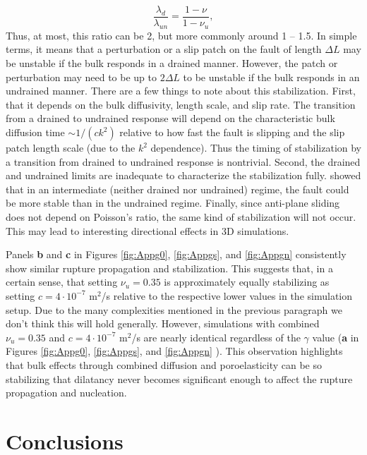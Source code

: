 \documentclass[draft]{agujournal2019}
\begin{document}
\begin{equation}
\frac{\lambda_d}{\lambda_{un}} = \frac{1 - \nu}{1 - \nu_u},
\end{equation}
Thus, at most, this ratio can be 2, but more commonly around 1 -- 1.5. In simple terms, it means that a perturbation or a slip patch on the fault of length $\Delta L$ may be unstable if the bulk responds in a drained manner. However, the patch or perturbation may need to be up to $2 \Delta L$ to be unstable if the bulk responds in an undrained manner. There are a few things to note about this stabilization. First, that it depends on the bulk diffusivity, length scale, and slip rate. The transition from a drained to undrained response will depend on the characteristic bulk diffusion time $\sim 1/(c k^2)$ relative to how fast the fault is slipping and the slip patch length scale (due to the $k^2$ dependence). Thus the timing of stabilization by a transition from drained to undrained response is nontrivial. Second, the drained and undrained limits are inadequate to characterize the stabilization fully.  showed that in an intermediate (neither drained nor undrained) regime, the fault could be more stable than in the undrained regime. Finally, since anti-plane sliding does not depend on Poisson's ratio, the same kind of stabilization will not occur. This may lead to interesting directional effects in 3D simulations. 

Panels {\bf b} and {\bf c} in Figures  \ref{fig:Appg0}, \ref{fig:Appgs}, and \ref{fig:Appgn} consistently show similar  rupture propagation and stabilization. This suggests that, in a certain sense, that setting $\nu_u = 0.35$ is approximately equally stabilizing as setting $c = 4 \cdot 10^{-7}$ m$^2$/s relative to the respective lower values in the simulation setup. Due to the many complexities mentioned in the previous paragraph we don't think this will hold generally. However, simulations with combined $\nu_u = 0.35$ and $c = 4 \cdot 10^{-7}$ m$^2$/s are nearly identical regardless of the $\gamma$ value ({\bf a} in Figures  \ref{fig:Appg0}, \ref{fig:Appgs}, and \ref{fig:Appgn} ). This observation highlights that bulk effects through combined diffusion and poroelasticity can be so stabilizing that dilatancy never becomes significant enough to affect the rupture propagation and nucleation.


\section{Conclusions}
\end{document}
